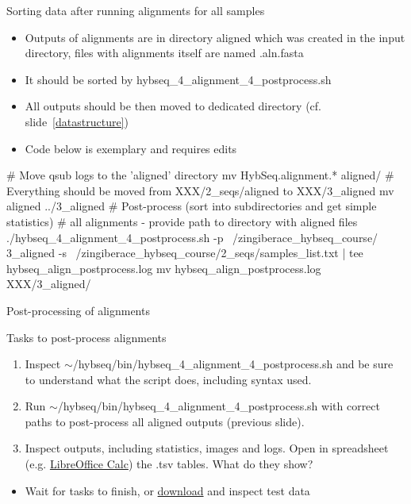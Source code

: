 \documentclass[compress, ucs, xelatex, 11pt, xcolor=x11names, aspectratio=169,
	hyperref={
		bookmarks=true,
		unicode=true,
		colorlinks=true,
		pdftitle={HybSeq course},
		plainpages=false,
		pdfauthor={Vojtech Zeisek},
		pdfsubject={Practical processing of HybSeq target enrichment sequencing data on computing grids like MetaCentrum},
		pdfcreator={XeLaTeX},
		pdfkeywords={BASH, command line, GNU, HybSeq, Linux, MetaCentrum, sequencing shell, target enrichment},
		linkcolor=Turquoise4, %
		anchorcolor=DodgerBlue4, %
		citecolor=DodgerBlue4, %
		filecolor=DodgerBlue4, %
		menucolor=Tan4, %
		urlcolor=DarkOliveGreen4, %
		pdftex},
	url={hyphens, lowtilde} %
	]{beamer}
\renewcommand{\texttt}[1]{\colorbox{Cornsilk2}{{\ttfamily #1}}}
\renewcommand{\alert}[1]{\textcolor{OrangeRed3}{#1}}
\begin{document}
\begin{frame}[fragile]{Sorting data after running alignments for all samples}
	\begin{itemize}
		\item Outputs of alignments are in directory \texttt{aligned} which was created in the input directory, files with alignments itself are named \texttt{*.aln.fasta}
		\item It should be sorted by \texttt{hybseq\_4\_alignment\_4\_postprocess.sh}
		\item All outputs should be then moved to dedicated directory (cf. slide~\ref{datastructure})
		\item \alert{Code below is exemplary and requires edits}
	\end{itemize}
	\begin{bashcode}
    # Move qsub logs to the 'aligned' directory
    mv HybSeq.alignment.* aligned/
    # Everything should be moved from XXX/2_seqs/aligned to XXX/3_aligned
    mv aligned ../3_aligned
    # Post-process (sort into subdirectories and get simple statistics)
    # all alignments - provide path to directory with aligned files
    ./hybseq_4_alignment_4_postprocess.sh -p ~/zingiberace_hybseq_course/
      3_aligned -s ~/zingiberace_hybseq_course/2_seqs/samples_list.txt |
      tee hybseq_align_postprocess.log
    mv hybseq_align_postprocess.log XXX/3_aligned/
	\end{bashcode}
\end{frame}

\begin{frame}{Post-processing of alignments}
	\begin{exampleblock}{Tasks to post-process alignments}
		\begin{enumerate}
			\item Inspect \texttt{$\sim$/hybseq/bin/hybseq\_4\_alignment\_4\_postprocess.sh} and be sure to understand what the script does, including syntax used.
			\item Run \texttt{$\sim$/hybseq/bin/hybseq\_4\_alignment\_4\_postprocess.sh} with correct paths to post-process all aligned outputs (previous slide).
			\item Inspect outputs, including statistics, images and logs. Open in spreadsheet (e.g. \href{https://www.libreoffice.org/}{LibreOffice Calc}) the \texttt{*.tsv} tables. What do they show?
		\end{enumerate}
	\end{exampleblock}
	\vfill
	\begin{itemize}
		\item Wait for tasks to finish, or \href{https://botany.natur.cuni.cz/zeisek/hybseq_course_zingibers_3_aligned.zip}{download} and inspect test data
	\end{itemize}
	\vfill
\end{frame}
\end{document}
